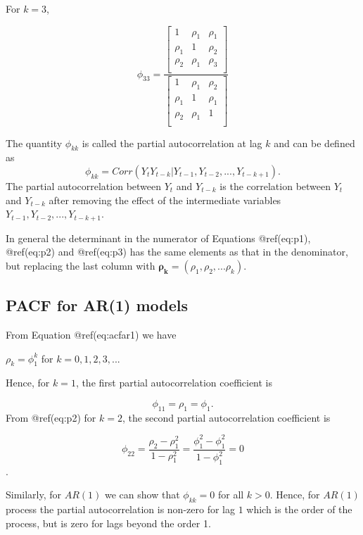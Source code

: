 \documentclass[
  11pt,
  a4paper,
]{report}
\begin{document}
For \(k=3\),

\begin{equation}
\label{eq:p3}
\phi_{33}=\frac{\left[\begin{array}
{rrr}
1 & \rho_1 & \rho_1  \\
\rho_1 & 1 & \rho_2  \\
\rho_2 & \rho_1 & \rho_3  \\
\end{array}\right]}{\left[\begin{array}
{rrr}
1 & \rho_1 & \rho_2  \\
\rho_1 & 1 & \rho_1  \\
\rho_2 & \rho_1 & 1  \\
\end{array}\right]}
\end{equation}

The quantity \(\phi_{kk}\) is called the partial autocorrelation at lag
\(k\) and can be defined as
\[\phi_{kk}=Corr(Y_tY_{t-k}|Y_{t-1}, Y_{t-2},..., Y_{t-k+1}).\] The
partial autocorrelation between \(Y_t\) and \(Y_{t-k}\) is the
correlation between \(Y_t\) and \(Y_{t-k}\) after removing the effect of
the intermediate variables \(Y_{t-1}, Y_{t-2}, ..., Y_{t-k+1}\).

In general the determinant in the numerator of Equations @ref(eq:p1),
@ref(eq:p2) and @ref(eq:p3) has the same elements as that in the
denominator, but replacing the last column with
\(\bm{\rho_k}= (\rho_1, \rho_2,...\rho_k).\)

\subsection{PACF for AR(1) models}\label{pacf-for-ar1-models}

From Equation @ref(eq:acfar1) we have

\(\rho_k=\phi_1^k\) for \(k=0, 1, 2, 3,...\)

Hence, for \(k=1\), the first partial autocorrelation coefficient is

\[\phi_{11}=\rho_1=\phi_1.\] From @ref(eq:p2) for \(k=2\), the second
partial autocorrelation coefficient is

\[\phi_{22}=\frac{\rho_2-\rho_1^2}{1-\rho_1^2}=\frac{\phi_1^2-\phi_1^2}{1-\phi_1^2} = 0\].

Similarly, for \(AR(1)\) we can show that \(\phi_{kk}=0\) for all
\(k > 0\). Hence, for \(AR(1)\) process the partial autocorrelation is
non-zero for lag \(1\) which is the order of the process, but is zero
for lags beyond the order 1.
\end{document}
